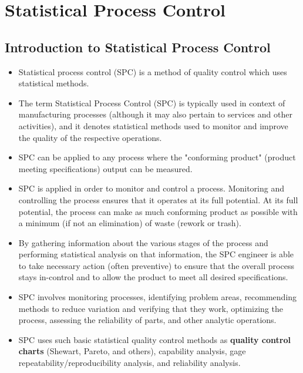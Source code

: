 \documentclass[]{report}
\title{}
\author{}
\begin{document}
\large
\tableofcontents
\newpage
\chapter{Statistical Process Control}



\section{Introduction to Statistical Process Control}
\begin{itemize}
	\item Statistical process control (SPC) is a method of quality control which uses statistical methods. 
	\item The term Statistical Process Control (SPC) is typically used in context of manufacturing processes (although it may also pertain to services and other activities), and it denotes statistical methods used to monitor and improve the quality of the respective operations. 
	\item  SPC can be applied to any process where the "conforming product" (product meeting specifications) output can be measured. 
	\item SPC is applied in order to monitor and control a process. Monitoring and controlling the process ensures that it operates at its full potential. At its full potential, the process can make as much conforming product as possible with a minimum (if not an elimination) of waste (rework or trash). 
	
	\item By gathering information about the various stages of the process and performing statistical analysis on that information, the SPC engineer is able to take necessary action (often preventive) to ensure that the overall process stays in-control and to allow the product to meet all desired specifications.
	
	\item SPC involves monitoring processes, identifying problem areas, recommending methods to reduce variation and verifying that they work, optimizing the process, assessing the reliability of parts, and other analytic operations. 
	
	\item SPC uses such basic statistical quality control methods as \textbf{quality control charts} (Shewart, Pareto, and others), capability analysis, gage repeatability/reproducibility analysis, and reliability analysis.
\end{itemize}
\end{document}
